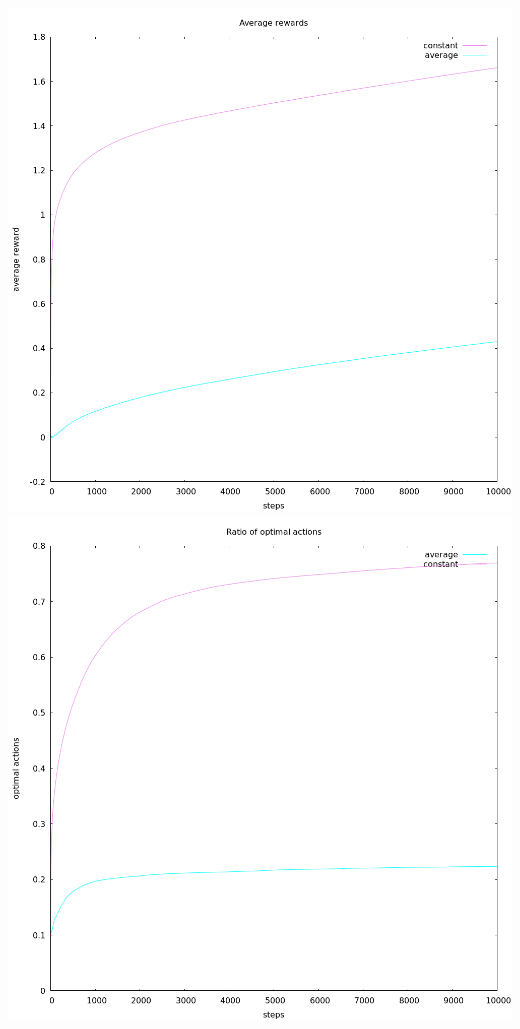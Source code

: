 \documentclass[12pt,a4paper]{article}
\begin{document}
\begin{enumerate}
  \begin{center}
  \includegraphics[scale=0.3]{average}
  \\
  \includegraphics[scale=0.3]{optimal}
\end{center}



\end{enumerate}
\end{document}
